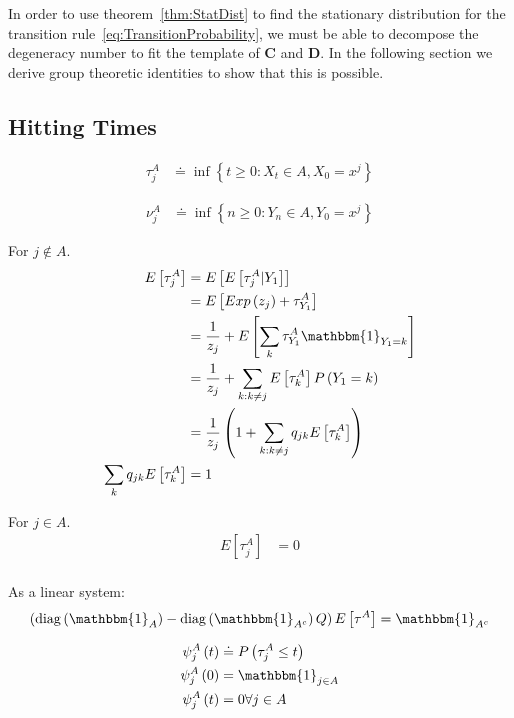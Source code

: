 In order to use theorem~\ref{thm:StatDist} to find the stationary distribution for the transition rule~\ref{eq:TransitionProbability}, we must be able to decompose the degeneracy number \Sjk\spc to fit the template of $\mathbf{C}$ and $\mathbf{D}$. In the following section we derive group theoretic identities to show that this is possible.

\subsection{Hitting Times}

\begin{align}
	\tau^{A}_{j} &\doteq \inf\left\{t \geq 0 : X_t \in A, X_0 = x^j\right\}
\end{align}

\begin{align}
	\nu^{A}_{j} &\doteq \inf\left\{n \geq 0 : Y_n \in A, Y_0 = x^j\right\}
\end{align}

For $j \not\in A$.
\begin{align}
	E\left[\tau^{A}_{j}\right] &= E\left[E\left[\tau^{A}_{j} | Y_1 \right]\right] \\
        &= E\left[ Exp\left(z_j\right) + \tau^{A}_{Y_1} \right] \\
        &=  \frac{1}{z_j} + E\left[\sum_{k}\tau^{A}_{Y_1}\mathbbm{1}_{Y_1 = k}\right] \\
        &=  \frac{1}{z_j} + \sum_{k: k\neq j}E\left[\tau^{A}_{k}\right] P\left(Y_1 = k\right) \\
        &=  \frac{1}{z_j}\left(1 + \sum_{k: k\neq j}q_{jk}E\left[\tau^{A}_{k}\right]\right)     \\
  \sum_{k}q_{jk}E\left[\tau^{A}_{k}\right] &= 1 \\
\end{align}

For $j \in A$.
\begin{align}
	E\left[\tau^{A}_{j}\right] &= 0 \\
\end{align}

As a linear system:
\begin{align}
	\left(\diag\left(\mathbbm{1}_A\right) - \diag\left(\mathbbm{1}_{A^c}\right)Q\right)E\left[\tau^{A}\right] =\mathbbm{1}_{A^c}\\
\end{align}


\begin{align}
\psi_j^A\left(t\right) &\doteq P\left(\tau^A_j \leq t\right) \\
\psi_j^A\left(0\right) &= \mathbbm{1}_{j\in A} \\
\psi_j^A\left(t\right) &= 0 \forall j \in A \\                       
\end{align}


